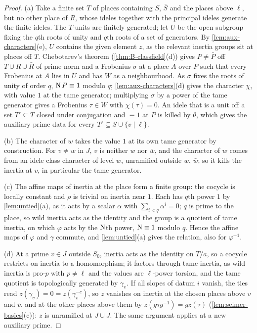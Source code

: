 \begin{proof}
(a) Take a finite set $T$ of places containing $S$, $\bar S$ and the places above $\ell$, but no other place of $R$, whose ideles together with the principal ideles generate the finite ideles. The $T$-units are finitely generated; let $U$ be the open subgroup fixing the $q$th roots of unity and $q$th roots of a set of generators.
By \cref{lem:aux-characters}(e), $U$ contains the given element $z$, as the relevant inertia groups sit at places off $T$. Chebotarev's theorem (\cref{thm:B-classfield}(d)) gives $P\ne\bar P$ off $T\cup R\cup\bar R$ of prime norm and a Frobenius $\sigma$ at a place $A$ over $P$ such that every Frobenius at $A$ lies in $U$ and has $W$ as a
neighbourhood. As $\sigma$ fixes the roots of unity of order $q$, $\operatorname{N} P\equiv1$ modulo $q$; \cref{lem:aux-characters}(d) gives the character $\chi$, with value $1$ at the tame generator; multiplying $\sigma$ by a power of the tame generator gives a Frobenius $\tau\in W$ with $\chi(\tau)=0$. An idele that is a unit off a set
$T'\subseteq T$ closed under conjugation and $\equiv1$ at $P$ is killed by $\theta$, which gives the auxiliary prime data for every $T'\subseteq S\cup\{v\mid\ell\}$.

(b) The character of $w$ takes the value $1$ at its own tame generator by construction. For $v\ne w$ in $J$, $v$ is neither $w$ nor $\bar w$, and the character of $w$ comes from an idele class character of level $w$, unramified outside $w$, $\bar w$; so it kills the inertia at $v$, in particular the tame generator.

(c) The affine maps of inertia at the place form a finite group: the cocycle is locally constant and $\rho$ is trivial on inertia near $1$. Each has $q$th power $1$ by \cref{lem:untied}(a), as it acts by a scalar $\alpha$ with $\sum_{i<q}\alpha^i=0$; $q$ is prime to the place, so wild inertia acts as the identity and the group is a quotient of tame inertia, on
which $\varphi$ acts by the $\operatorname{N}$th power, $\operatorname{N}\equiv1$ modulo $q$. Hence the affine maps of $\varphi$ and $\gamma$ commute, and \cref{lem:untied}(a) gives the relation, also for $\varphi^{-1}$.

(d) At a prime $v\in J$ outside $S_0$, inertia acts as the identity on $T/a$, so a cocycle restricts on inertia to a homomorphism; it factors through tame inertia, as wild inertia is pro-$p$ with $p\ne\ell$ and the values are $\ell$-power torsion, and the tame quotient is topologically generated by $\gamma_v$. If all slopes of datum $i$ vanish, the
ties read $z(\gamma_v)=0=z(\gamma_v^{-c})$, so $z$ vanishes on inertia at the chosen places above $v$ and $\bar v$, and at the other places above them by $z(g\tau g^{-1})=gz(\tau)$ (\cref{lem:selmer-basics}(c)): $z$ is unramified at $J\cup\bar J$. The same argument applies at a new auxiliary prime.
\end{proof}

